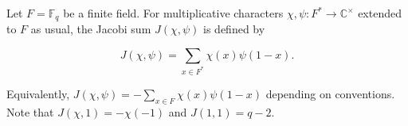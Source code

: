 Let $F = \mathbb{F}_q$ be a finite field. For multiplicative characters $\chi, \psi: F^* \to \mathbb{C}^\times$ extended to $F$ as usual, the Jacobi sum $J(\chi, \psi)$ is defined by

$$J(\chi, \psi) = \sum_{x \in F^*} \chi(x) \psi(1 - x).$$

Equivalently, $J(\chi, \psi) = -\sum_{x \in F} \chi(x) \psi(1-x)$ depending on conventions. Note that $J(\chi, 1) = -\chi(-1)$ and $J(1, 1) = q - 2$.
